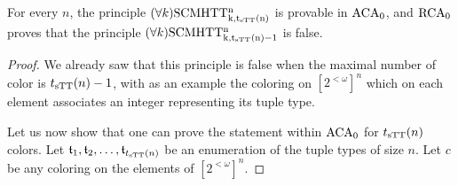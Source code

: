 \begin{theorem} \label{th:strong_gen_treeth}
For every $n$, the principle $(\forall k) \mathrm{SCMHTT^n_{k,t_{\mathrm{sTT}}(n)}}$ is provable in $\mathrm{ACA}_0$, and $\mathrm{RCA}_0$ proves that the principle $(\forall k) \mathrm{SCMHTT^n_{k,t_{\mathrm{sTT}}(n)-1}}$ is false.
\end{theorem}
\begin{proof}
We already saw that this principle is false when the maximal number of color is $t_{\mathrm{sTT}}(n)-1$, with as an example the coloring on $[2^{<\omega}]^n$ which on each element associates an integer representing its tuple type.

Let us now show that one can prove the statement within $\mathrm{ACA}_0$ for $t_{\mathrm{sTT}}(n)$ colors. Let $\mathfrak{t}_1, \mathfrak{t}_2, \dots, \mathfrak{t}_{t_{\mathrm{sTT}}(n)}$ be an enumeration of the tuple types of size $n$. Let $c$ be any coloring on the elements of $[2^{<\omega}]^n$.







\end{proof}
